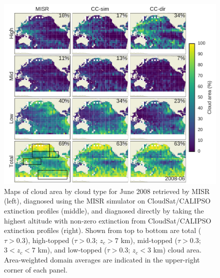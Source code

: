 \begin{figure}[tp]
\centering
\includegraphics{graphics/misr_cldmisr_maps_2008-06.pdf}
\caption{\label{fig:misr_cldmisr_maps_june}Maps of cloud area by cloud
type for June 2008 retrieved by MISR (left), diagnosed using the MISR
simulator on CloudSat/CALIPSO extinction profiles (middle), and
diagnosed directly by taking the highest altitude with non-zero
extinction from CloudSat/CALIPSO extinction profiles (right). Shown from
top to bottom are total (\(\tau > 0.3\)), high-topped (\(\tau > 0.3\);
\(z_c > 7\) km), mid-topped (\(\tau > 0.3\); \(3 < z_c < 7\) km), and
low-topped (\(\tau > 0.3\); \(z_c < 3\) km) cloud area. Area-weighted
domain averages are indicated in the upper-right corner of each
panel.}\label{fig:misrux5fcldmisrux5fmapsux5fjune}
\end{figure}

